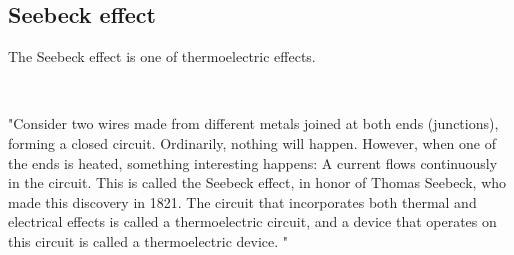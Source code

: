 \documentclass[reprint,amsmath,amssymb,aps,]{revtex4-1}
\numberwithin{equation}{section}%
\begin{document}
\subsection{Seebeck effect}


    The Seebeck effect is one of thermoelectric effects.

    \

    "Consider two wires made from different metals joined at both ends (junctions), forming a closed circuit. Ordinarily, nothing will happen. However, when one of the ends is heated, something interesting happens: A current flows continuously in the circuit. This is  called the Seebeck effect, in honor of Thomas Seebeck, who made this discovery in 1821. The circuit that incorporates both thermal and electrical effects is called a thermoelectric circuit, and a device that operates on this circuit is called a thermoelectric device. \cite{Cengel}"


\end{document}
